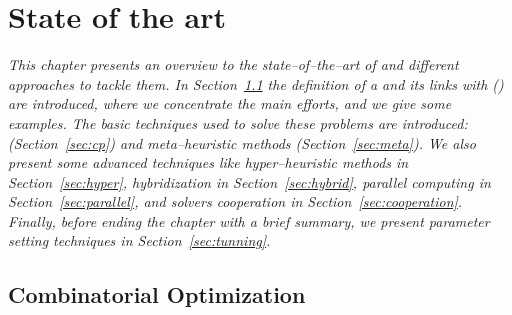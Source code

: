 \chapter{State of the art}
\label{chap:art}
\textit{This chapter presents an overview to the state--of--the--art of \COPs{} and different approaches to tackle them. In Section~\ref{sec:combi} the definition of a \COP{} and its links with \CSPs{} (\csp) are introduced, where we concentrate the main efforts, and we give some examples. The basic techniques used to solve these problems are introduced: {\it \cp} (Section~\ref{sec:cp}) and {\it meta--heuristic methods} (Section~\ref{sec:meta}). We also present some advanced techniques like {\it hyper--heuristic methods} in Section~\ref{sec:hyper}, {\it hybridization} in Section~\ref{sec:hybrid}, {\it parallel computing} in Section~\ref{sec:parallel}, and {\it solvers cooperation} in Section~\ref{sec:cooperation}. Finally, before ending the chapter with a brief summary, we present {\it parameter setting techniques} in Section~\ref{sec:tunning}.}
\vfill
\minitoc
\newpage



\section{Combinatorial Optimization}\label{sec:combi}


